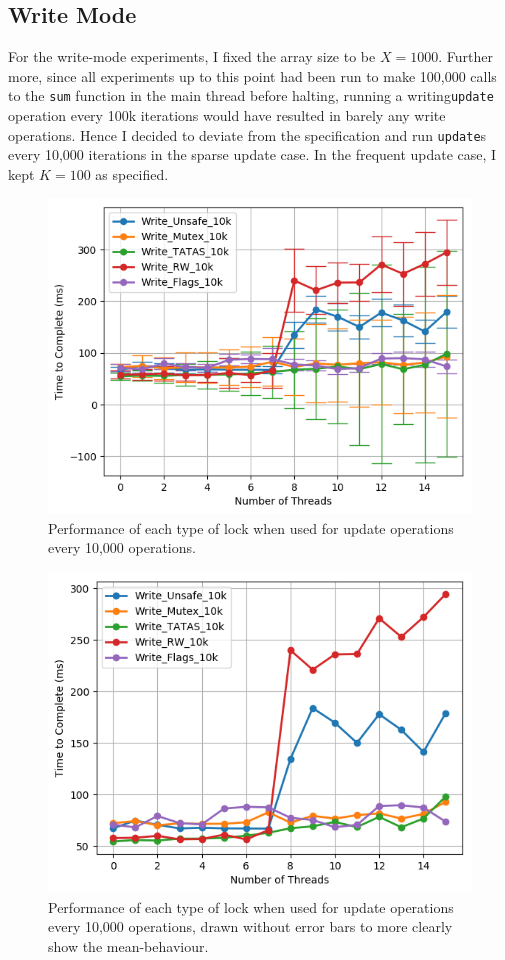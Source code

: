 \documentclass[11pt]{article}
\begin{document}
\subsection{Write Mode}


For the write-mode experiments, I fixed the array size to be $X = 1000$. Further more, since all experiments up to this point had been run to make 100,000 calls to the \texttt{sum} function in the main thread before halting, running a writing\texttt{update} operation every 100k iterations would have resulted in barely any write operations. Hence I decided to deviate from the specification and run \texttt{update}s every 10,000 iterations in the sparse update case.
In the frequent update case, I kept $K=100$ as specified.
\begin{figure}\label{fig:step7_1}
\centering
\includegraphics[scale=0.65]{step7_1.png}
\caption{Performance of each type of lock when used for update operations every 10,000 operations.}
\end{figure}

\begin{figure}\label{fig:step7_2}
\centering
\includegraphics[scale=0.65]{step7_2.png}
\caption{Performance of each type of lock when used for update operations every 10,000 operations, drawn without error bars to more clearly show the mean-behaviour.}
\end{figure}
\end{document}
